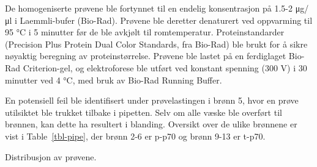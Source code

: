 \documentclass[
  letterpaper,
  DIV=11,
  numbers=noendperiod]{scrreprt}
\begin{document}
De homogeniserte prøvene ble fortynnet til en endelig konsentrasjon på
1.5-2 μg/μl i Laemmli-bufer (Bio-Rad). Prøvene ble deretter denaturert
ved oppvarming til 95 °C i 5 minutter før de ble avkjølt til
romtemperatur. Proteinstandarder (Precision Plus Protein Dual Color
Standards, fra Bio-Rad) ble brukt for å sikre nøyaktig beregning av
proteinstørrelse. Prøvene ble lastet på en ferdiglaget Bio-Rad
Criterion-gel, og elektroforese ble utført ved konstant spenning (300 V)
i 30 minutter ved 4 °C, med bruk av Bio-Rad Running Buffer.

En potensiell feil ble identifisert under prøvelastingen i brønn 5, hvor
en prøve utilsiktet ble trukket tilbake i pipetten. Selv om alle væske
ble overført til brønnen, kan dette ha resultert i blanding. Oversikt
over de ulike brønnene er vist i Table~\ref{tbl-pipe}, der brønn 2-6 er
p-p70 og brønn 9-13 er t-p70.

\begin{table}

\caption{\label{tbl-pipe}Distribusjon av prøvene.}


\end{table}%
\end{document}
